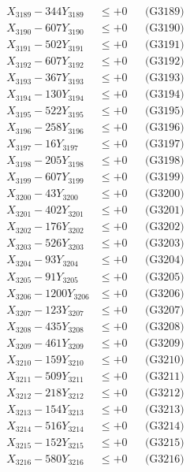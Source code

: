 \documentclass[a4paper,10pt]{article}
\begin{document}
{\begin{align}
X_{3189} - 344Y_{3189} &\leq +0 && \text{(G3189)} \\
X_{3190} - 607Y_{3190} &\leq +0 && \text{(G3190)} \\
\allowbreak
X_{3191} - 502Y_{3191} &\leq +0 && \text{(G3191)} \\
X_{3192} - 607Y_{3192} &\leq +0 && \text{(G3192)} \\
X_{3193} - 367Y_{3193} &\leq +0 && \text{(G3193)} \\
X_{3194} - 130Y_{3194} &\leq +0 && \text{(G3194)} \\
X_{3195} - 522Y_{3195} &\leq +0 && \text{(G3195)} \\
X_{3196} - 258Y_{3196} &\leq +0 && \text{(G3196)} \\
X_{3197} - 16Y_{3197} &\leq +0 && \text{(G3197)} \\
X_{3198} - 205Y_{3198} &\leq +0 && \text{(G3198)} \\
X_{3199} - 607Y_{3199} &\leq +0 && \text{(G3199)} \\
X_{3200} - 43Y_{3200} &\leq +0 && \text{(G3200)} \\
\allowbreak
X_{3201} - 402Y_{3201} &\leq +0 && \text{(G3201)} \\
X_{3202} - 176Y_{3202} &\leq +0 && \text{(G3202)} \\
X_{3203} - 526Y_{3203} &\leq +0 && \text{(G3203)} \\
X_{3204} - 93Y_{3204} &\leq +0 && \text{(G3204)} \\
X_{3205} - 91Y_{3205} &\leq +0 && \text{(G3205)} \\
X_{3206} - 1200Y_{3206} &\leq +0 && \text{(G3206)} \\
X_{3207} - 123Y_{3207} &\leq +0 && \text{(G3207)} \\
X_{3208} - 435Y_{3208} &\leq +0 && \text{(G3208)} \\
X_{3209} - 461Y_{3209} &\leq +0 && \text{(G3209)} \\
X_{3210} - 159Y_{3210} &\leq +0 && \text{(G3210)} \\
\allowbreak
X_{3211} - 509Y_{3211} &\leq +0 && \text{(G3211)} \\
X_{3212} - 218Y_{3212} &\leq +0 && \text{(G3212)} \\
X_{3213} - 154Y_{3213} &\leq +0 && \text{(G3213)} \\
X_{3214} - 516Y_{3214} &\leq +0 && \text{(G3214)} \\
X_{3215} - 152Y_{3215} &\leq +0 && \text{(G3215)} \\
X_{3216} - 580Y_{3216} &\leq +0 && \text{(G3216)} \\

\end{align}}
\end{document}
